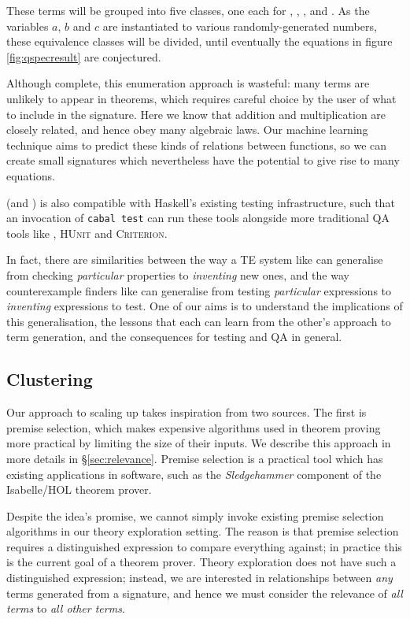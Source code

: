 These terms will be grouped into five classes, one each for , , ,  and . As the variables $a$, $b$ and $c$ are instantiated to various randomly-generated numbers, these equivalence classes will be divided, until eventually the equations in figure \ref{fig:qspecresult} are conjectured.

Although complete, this enumeration approach is wasteful: many terms are unlikely to appear in theorems, which requires careful choice by the user of what to include in the signature. Here we know that addition and multiplication are closely related, and hence obey many algebraic laws. Our machine learning technique aims to predict these kinds of relations between functions, so we can create small signatures which nevertheless have the potential to give rise to many equations.

\qspec{} (and \hspec{}) is also compatible with Haskell's existing testing infrastructure, such that an invocation of \texttt{cabal test} can run these tools alongside more traditional QA tools like \qcheck{}, \textsc{HUnit} and \textsc{Criterion}.

In fact, there are similarities between the way a TE system like \qspec{} can generalise from checking \emph{particular} properties to \emph{inventing} new ones, and the way counterexample finders like \qcheck{} can generalise from testing \emph{particular} expressions to \emph{inventing} expressions to test. One of our aims is to understand the implications of this generalisation, the lessons that each can learn from the other's approach to term generation, and the consequences for testing and QA in general.

\subsection{Clustering}
\label{sec:clustering}

Our approach to scaling up \qspec{} takes inspiration from two sources. The first is premise selection, which makes expensive algorithms used in theorem proving more practical by limiting the size of their inputs. We describe this approach in more details in \S \ref{sec:relevance}. Premise selection is a practical tool which has existing applications in software, such as the \emph{Sledgehammer} component of the Isabelle/HOL theorem prover.

Despite the idea's promise, we cannot simply invoke existing premise selection algorithms in our theory exploration setting. The reason is that premise selection requires a distinguished expression to compare everything against; in practice this is the current goal of a theorem prover. Theory exploration does not have such a distinguished expression; instead, we are interested in relationships between \emph{any} terms generated from a signature, and hence we must consider the relevance of \emph{all terms} to \emph{all other terms}.

